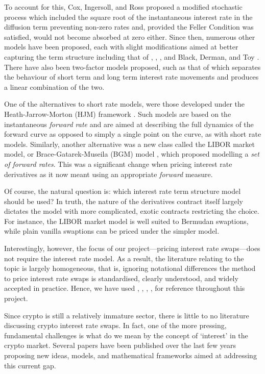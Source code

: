 To account for this, Cox, Ingersoll, and Ross proposed a modified stochastic process \citep{cox1985theory} which included the square root of the instantaneous interest rate in the diffusion term preventing non-zero rates and, provided the Feller Condition was satisfied, would not become absorbed at zero either. Since then, numerous other models have been proposed, each with slight modifications aimed at better capturing the term structure including that of \cite{ho1986term}, \cite{hull1993one}, \cite{black1991bond}, and Black, Derman, and Toy \citep{black1990one}. There have also been two-factor models proposed, such as that of \cite{longstaff1992interest} which separates the behaviour of short term and long term interest rate movements and produces a linear combination of the two. 

One of the alternatives to short rate models, were those developed under the Heath-Jarrow-Morton (HJM) framework \citep{heath1992bond}. Such models are based on the instantaneous \textit{forward rate} and are aimed at describing the full dynamics of the forward curve as opposed to simply a single point on the curve, as with short rate models. Similarly, another alternative was a new class called the LIBOR market model, or Brace-Gatarek-Museila (BGM) model \citep{brace1997market}, which proposed modelling a \textit{set of forward rates}. This was a significant change when pricing interest rate derivatives as it now meant using an appropriate \textit{forward} measure.

Of course, the natural question is: which interest rate term structure model should be used? In truth, the nature of the derivatives contract itself largely dictates the model with more complicated, exotic contracts restricting the choice. For instance, the LIBOR market model is well suited to Bermudan swaptions, while plain vanilla swaptions can be priced under the simpler \cite{black1976pricing} model.

Interestingly, however, the focus of our project––pricing interest rate swaps––does not require the interest rate model. As a result, the literature relating to the topic is largely homogeneous, that is, ignoring notational differences the method to price interest rate swaps is standardised, clearly understood, and widely accepted in practice. Hence, we have used \cite{brigo2001interest}, \cite{sadr2009interest}, \cite{flavell2012swaps}, \cite{wilmott2013paul}, \cite{veronesi2016handbook} for reference throughout this project. 

Since crypto is still a relatively immature sector, there is little to no literature discussing crypto interest rate swaps. In fact, one of the more pressing, fundamental challenges is what do we mean by the concept of `interest' in the crypto market. Several papers have been published over the last few years proposing new ideas, models, and mathematical frameworks aimed at addressing this current gap.

